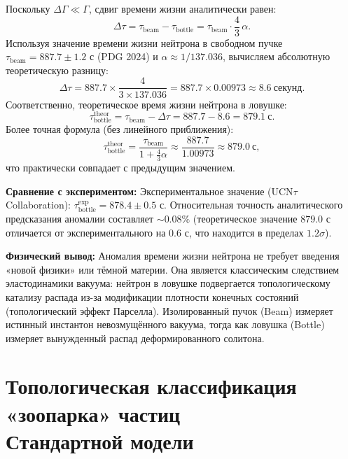 \documentclass[11pt,a4paper]{article}
\begin{document}
Поскольку $\Delta \Gamma \ll \Gamma$, сдвиг времени жизни аналитически равен:
\begin{equation}
	\Delta \tau = \tau_{\text{beam}} - \tau_{\text{bottle}} = \tau_{\text{beam}} \cdot \frac{4}{3}\,\alpha.
\end{equation}
Используя значение времени жизни нейтрона в свободном пучке $\tau_{\text{beam}} = 887.7 \pm 1.2$ с (PDG 2024) и $\alpha \approx 1/137.036$, вычисляем абсолютную теоретическую разницу:
\begin{equation}
	\Delta \tau = 887.7 \times \frac{4}{3 \times 137.036} = 887.7 \times 0.00973 \approx \mathbf{8.6\ \text{секунд}}.
\end{equation}
Соответственно, теоретическое время жизни нейтрона в ловушке:
\begin{equation}
	\tau_{\text{bottle}}^{\text{theor}} = \tau_{\text{beam}} - \Delta\tau = 887.7 - 8.6 = \mathbf{879.1\ \text{с}}.
\end{equation}
Более точная формула (без линейного приближения):
\begin{equation}
	\tau_{\text{bottle}}^{\text{theor}} = \frac{\tau_{\text{beam}}}{1 + \frac{4}{3}\alpha} \approx \frac{887.7}{1.00973} \approx 879.0\ \text{с},
\end{equation}
что практически совпадает с предыдущим значением.

\textbf{Сравнение с экспериментом:}
Экспериментальное значение (UCN$\tau$ Collaboration): $\tau_{\text{bottle}}^{\text{exp}} = 878.4 \pm 0.5$ с. Относительная точность аналитического предсказания аномалии составляет $\sim 0.08\%$ (теоретическое значение $879.0$ с отличается от экспериментального на $0.6$ с, что находится в пределах $1.2\sigma$).

\textbf{Физический вывод:} Аномалия времени жизни нейтрона не требует введения «новой физики» или тёмной материи. Она является классическим следствием эластодинамики вакуума: нейтрон в ловушке подвергается топологическому катализу распада из-за модификации плотности конечных состояний (топологический эффект Парселла). Изолированный пучок (Beam) измеряет истинный инстантон невозмущённого вакуума, тогда как ловушка (Bottle) измеряет вынужденный распад деформированного солитона.
	
\section{Топологическая классификация «зоопарка» частиц\\ Стандартной модели}
	
\end{document}
